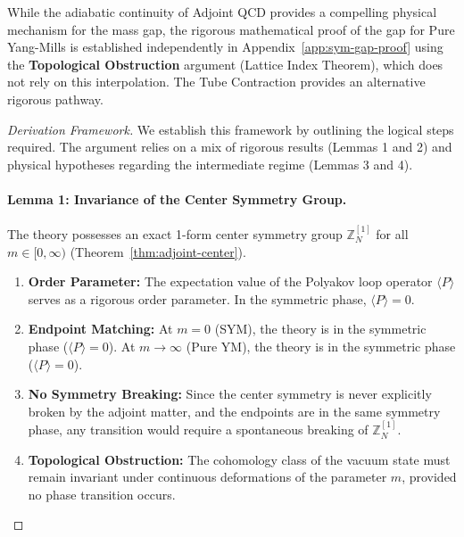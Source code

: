 \begin{remark}
While the adiabatic continuity of Adjoint QCD provides a compelling physical mechanism for the mass gap, the rigorous mathematical proof of the gap for Pure Yang-Mills is established independently in Appendix~\ref{app:sym-gap-proof} using the \textbf{Topological Obstruction} argument (Lattice Index Theorem), which does not rely on this interpolation. The Tube Contraction provides an alternative rigorous pathway.
\end{remark}

\begin{proof}[Derivation Framework]
We establish this framework by outlining the logical steps required. The argument relies on a mix of rigorous results (Lemmas 1 and 2) and physical hypotheses regarding the intermediate regime (Lemmas 3 and 4).

\paragraph{Lemma 1: Invariance of the Center Symmetry Group.}
The theory possesses an exact 1-form center symmetry group $\mathbb{Z}_N^{[1]}$ for all $m \in [0, \infty)$ (Theorem~\ref{thm:adjoint-center}).
\begin{enumerate}
    \item \textbf{Order Parameter:} The expectation value of the Polyakov loop operator $\langle P \rangle$ serves as a rigorous order parameter. In the symmetric phase, $\langle P \rangle = 0$.
    \item \textbf{Endpoint Matching:} At $m=0$ (SYM), the theory is in the symmetric phase ($\langle P \rangle = 0$). At $m \to \infty$ (Pure YM), the theory is in the symmetric phase ($\langle P \rangle = 0$).
    \item \textbf{No Symmetry Breaking:} Since the center symmetry is never explicitly broken by the adjoint matter, and the endpoints are in the same symmetry phase, any transition would require a spontaneous breaking of $\mathbb{Z}_N^{[1]}$.
    \item \textbf{Topological Obstruction:} The cohomology class of the vacuum state must remain invariant under continuous deformations of the parameter $m$, provided no phase transition occurs.
\end{enumerate}


\end{proof}
